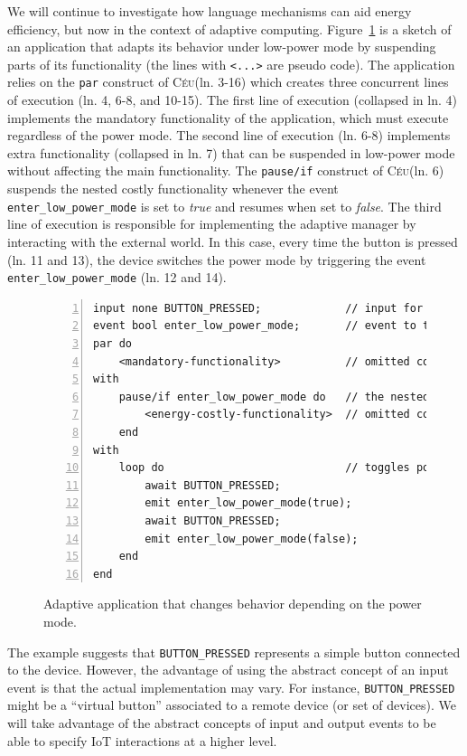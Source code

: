 \documentclass[12pt,english]{amsart}
\newcommand{\CEU}{\textsc{C\'{e}u}\xspace}
\newcommand{\code}[1] {{\small{\texttt{#1}}}}
\begin{document}
We will continue to investigate how language mechanisms can aid energy
efficiency, but now in the context of adaptive computing.
%
Figure~\ref{lst.pause} is a sketch of an application that adapts its behavior
under low-power mode by suspending parts of its functionality (the lines with
\code{<...>} are pseudo code).
%
The application relies on the \code{par} construct of \CEU (ln. 3-16) which
creates three concurrent lines of execution (ln. 4, 6-8, and 10-15).
The first line of execution (collapsed in ln. 4) implements the mandatory
functionality of the application, which must execute regardless of the power
mode.
The second line of execution (ln. 6-8) implements extra functionality
(collapsed in ln. 7) that can
be suspended in low-power mode without affecting the main functionality.
The \code{pause/if} construct of \CEU (ln. 6) suspends the nested costly
functionality whenever the event
\code{enter\_low\_power\_mode} is set to \emph{true} and resumes when set to
\emph{false}.
The third line of execution is responsible for implementing the adaptive
manager by interacting with the external world.
In this case, every time the button is pressed (ln. 11 and 13), the device switches
the power mode by triggering the event \code{enter\_low\_power\_mode}
(ln. 12 and 14).

{\linespread{1}
\begin{figure}[t]
\begin{lstlisting}[xleftmargin=1cm,numbers=left]
input none BUTTON_PRESSED;             // input for every button press
event bool enter_low_power_mode;       // event to toggle power mode
par do
    <mandatory-functionality>          // omitted code with basic functionality
with
    pause/if enter_low_power_mode do   // the nested block is suspended in low mode
        <energy-costly-functionality>  // omitted code with costly functionality
    end
with
    loop do                            // toggles power mode on every button press
        await BUTTON_PRESSED;
        emit enter_low_power_mode(true);
        await BUTTON_PRESSED;
        emit enter_low_power_mode(false);
    end
end
\end{lstlisting}
\caption{ Adaptive application that changes behavior depending on the power mode.
\label{lst.pause}
}
\end{figure}
}

The example suggests that \code{BUTTON\_PRESSED} represents a simple button
connected to the device.
%
However, the advantage of using the abstract concept of an input event is that
the actual implementation may vary.
%
For instance, \code{BUTTON\_PRESSED} might be a ``virtual button'' associated to a
remote device (or set of devices).
%
We will take advantage of the abstract concepts of input and output events to be
able to specify IoT interactions at a higher level.
\end{document}
